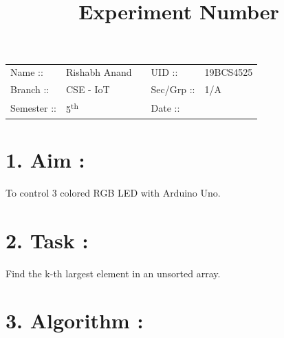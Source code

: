 \documentclass[14pt]{extarticle}
\title{%
    \textbf{
    \vspace{-3em} \\ 
    \Large Experiment Number \\
    \vspace{-4em}
    }
}
\author{}
\date{}
\begin{document}
\maketitle %

\section*{}
    \begin{tabular}{ llp{2cm}ll } 
        Name :: & Rishabh Anand & & UID :: & 19BCS4525  \\ 
        Branch :: & CSE - IoT & & Sec/Grp :: & 1/A \\ 
        Semester :: & 5\textsuperscript{th} & & Date :: & \shortdate{\today} \\
    \end{tabular}
    
\vspace{1em}

\section*{\normalsize 1. Aim :}
    
To control 3 colored RGB LED with Arduino Uno.

\section*{\normalsize 2. Task :}
    
Find the k-th largest element in an unsorted array.

\section*{\normalsize 3. Algorithm :}

   \begin{enumerate}
   \end{enumerate}
\end{document}
